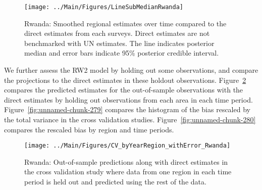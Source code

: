 \documentclass[12pt]{article}\usepackage[]{graphicx}\usepackage[]{color}
\newenvironment{knitrout}{}{} %
\begin{document}
\begin{knitrout}
\color{fgcolor}\begin{figure}[bht]

{\centering \texttt{[image: ../Main/Figures/LineSubMedianRwanda]} 

}

\caption[Rwanda]{Rwanda: Smoothed regional estimates over time compared to the direct estimates from each surveys. Direct estimates are not benchmarked with UN estimates. The line indicates posterior median and error bars indicate 95\% posterior credible interval.}\label{fig:unnamed-chunk-277}
\end{figure}


\end{knitrout}
We further assess the RW2 model by holding out some observations, and compare the projections to the direct estimates in these holdout observations. Figure~\ref{fig:unnamed-chunk-278} compares the predicted estimates for the out-of-sample observations  with the direct estimates by holding out observations from each area in each time period.  Figure~\ref{fig:unnamed-chunk-279} compares the histogram of the bias rescaled by the total variance in the cross validation studies. Figure~\ref{fig:unnamed-chunk-280} compares the rescaled bias by region and time periods.



 
\begin{knitrout}
\color{fgcolor}\begin{figure}[bht]

{\centering \texttt{[image: ../Main/Figures/CV\_byYearRegion\_withError\_Rwanda]} 

}

\caption[Rwanda]{Rwanda: Out-of-sample predictions along with direct estimates in the cross validation study where data from one region in each time period is held out and predicted using the rest of the data.}\label{fig:unnamed-chunk-278}
\end{figure}


\end{knitrout}
\end{document}
